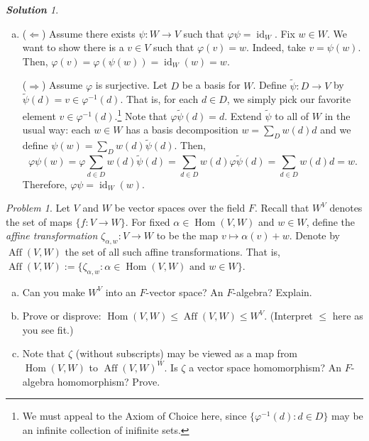 \documentclass[11pt]{paper}
\theoremstyle{remark}
\newtheorem{problem}{Problem}
\newtheorem*{solution}{{\bf Solution}}
\newcommand\0{\ensuremath{\mathbf{0}}}
\newcommand{\<}{\ensuremath{\langle}}
\renewcommand{\>}{\ensuremath{\rangle}}
\newcommand\Hom{\ensuremath{\operatorname{Hom}}}
\newcommand{\Aff}{\ensuremath{\operatorname{Aff}}}
\newcommand{\id}{\ensuremath{\operatorname{id}}}
\renewcommand{\phi}{\ensuremath{\varphi}}
\renewcommand{\leq}{\ensuremath{\leqslant}}
\begin{document}
\begin{solution}
\begin{enumerate}[(a)]

  \item ($\Leftarrow$) Assume there exists $\psi: W\rightarrow V$ such that
    $\phi \psi = \id_W$.  Fix $w\in W$. We want to show there is a $v\in V$ such
    that $\phi(v) = w$.  Indeed, take $v = \psi(w)$. Then, 
    $\phi(v) = \phi(\psi(w)) = \id_W(w) = w$.

($\Rightarrow$) Assume $\phi$ is surjective.  Let $D$ be a basis for
    $W$.  Define $\tilde{\psi}: D\rightarrow V$ by $\tilde{\psi}(d) = v \in
    \phi^{-1}(d)$.  That is, for each $d \in D$, we simply pick our favorite
    element $v\in \phi^{-1}(d)$.\footnote{We
    must appeal to the Axiom of Choice here, since $\{\phi^{-1}(d) : d \in D\}$
    may be an infinite collection of inifinite sets.} Note that 
    $\phi\tilde{\psi}(d) = d$.  Extend $\tilde{\psi}$ to all of $W$ in the usual
    way: each $w\in W$ has a basis decomposition $w = \sum_D w(d) d$ and we
    define $\psi(w) = \sum_D w(d) \tilde{\psi}(d)$.  Then,
\[
\phi\psi(w) = \phi \sum_{d\in D} w(d) \tilde{\psi}(d)
=\sum_{d\in D} w(d)  \phi \tilde{\psi}(d)
=\sum_{d\in D} w(d)  d = w.
\]
Therefore, $ \phi \psi = \id_W(w)$.

  \end{enumerate}

\end{solution}

\probskip

\begin{problem} Let $V$ and $W$ be vector spaces over the field $F$.
Recall that $W^V$ denotes the set of maps $\{f : V \rightarrow W\}$.
For fixed $\alpha \in \Hom(V,W)$ and $w \in W$, define the 
\emph{affine transformation} $\zeta_{\alpha, w}: V \rightarrow W$ to be the map 
$v \mapsto \alpha(v) + w$.
Denote by $\Aff (V, W)$ the set of all such affine transformations.  That is,
$\Aff (V, W) := \{\zeta_{\alpha, w} : \alpha \in \Hom(V,W) \text{ and } w \in W\}$.
\begin{enumerate}[(a)]
\item Can you make $W^V$ into an $F$-vector space? An $F$-algebra? Explain.
\item Prove or disprove: $\Hom(V,W) \leq \Aff (V, W) \leq W^{V}$. 
(Interpret $\leq$ here as you see fit.)
\item Note that $\zeta$ (without subscripts) may be viewed as a map from 
$\Hom(V,W)$ to $\Aff(V,W)^W$. Is $\zeta$ a vector space
  homomorphism?  An $F$-algebra homomorphism? Prove.
\end{enumerate}

\end{problem}
\end{document}
